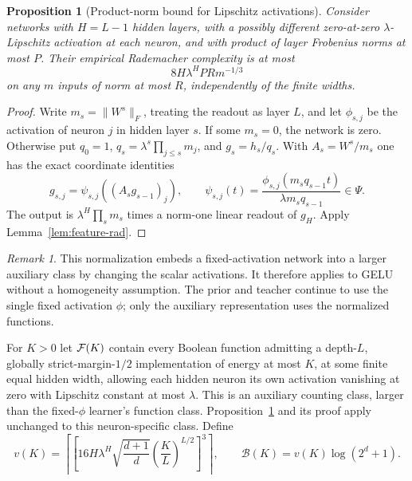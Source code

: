 \documentclass[11pt]{article}
\newtheorem{proposition}[theorem]{Proposition}
\theoremstyle{remark}\newtheorem{remark}[theorem]{Remark}
\begin{document}
\begin{proposition}[Product-norm bound for Lipschitz activations]\label{prop:product-rad}
Consider networks with $H=L-1$ hidden layers, with a possibly different zero-at-zero $\lambda$-Lipschitz activation at each neuron, and with product of layer Frobenius norms at most $P$. Their empirical Rademacher complexity is at most
\[
 8H\lambda^H PRm^{-1/3}
\]
on any $m$ inputs of norm at most $R$, independently of the finite widths.
\end{proposition}
\begin{proof}
Write $m_s=\|W^s\|_F$, treating the readout as layer $L$, and let $\phi_{s,j}$ be the activation of neuron $j$ in hidden layer $s$. If some $m_s=0$, the network is zero. Otherwise put $q_0=1$, $q_s=\lambda^s\prod_{j\le s}m_j$, and $g_s=h_s/q_s$. With $A_s=W^s/m_s$ one has the exact coordinate identities
\[
 g_{s,j}=\psi_{s,j}((A_sg_{s-1})_j),\qquad
 \psi_{s,j}(t)=\frac{\phi_{s,j}(m_sq_{s-1}t)}{\lambda m_sq_{s-1}}\in\Psi.
\]
The output is $\lambda^H\prod_sm_s$ times a norm-one linear readout of $g_H$. Apply Lemma~\ref{lem:feature-rad}.
\end{proof}

\begin{remark}
This normalization embeds a fixed-activation network into a larger auxiliary class by changing the scalar activations. It therefore applies to GELU without a homogeneity assumption. The prior and teacher continue to use the single fixed activation $\phi$; only the auxiliary representation uses the normalized functions.
\end{remark}

For $K>0$ let $\mathcal F(K)$ contain every Boolean function admitting a depth-$L$, globally strict-margin-$1/2$ implementation of energy at most $K$, at some finite equal hidden width, allowing each hidden neuron its own activation vanishing at zero with Lipschitz constant at most $\lambda$. This is an auxiliary counting class, larger than the fixed-$\phi$ learner's function class. Proposition~\ref{prop:product-rad} and its proof apply unchanged to this neuron-specific class. Define
\begin{equation}\label{eq:capacity-budget}
 v(K)=\left\lceil\left[16H\lambda^H\sqrt{\frac{d+1}{d}}
                   \left(\frac KL\right)^{L/2}\right]^3\right\rceil,
 \qquad \mathcal B(K)=v(K)\log(2^d+1).
\end{equation}
\end{document}
